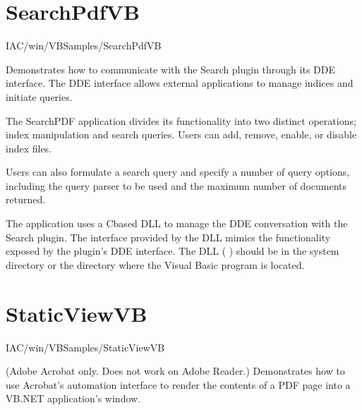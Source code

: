\documentclass[letterpaper,12pt,english,openany,oneside]{sphinxmanual}
\begin{document}
\section{SearchPdfVB}
\label{\detokenize{Samples_WindowsIAC:searchpdfvb}}\label{\detokenize{Samples_WindowsIAC:location-21}}

IAC/win/VBSamples/SearchPdfVB

\label{\detokenize{Samples_WindowsIAC:description-21}}

Demonstrates how to communicate with the Search plugin through its DDE interface. The DDE interface allows external applications to manage indices and initiate queries.

\label{\detokenize{Samples_WindowsIAC:usage-13}}

The SearchPDF application divides its functionality into two distinct operations; index manipulation and search queries. Users can add, remove, enable, or disable index files.

Users can also formulate a search query and specify a number of query options, including the query parser to be used and the maximum number of documents returned.

\label{\detokenize{Samples_WindowsIAC:implementation-details-5}}

The application uses a C\sphinxhyphen{}based DLL to manage the DDE conversation with the Search plugin. The interface provided by the DLL mimics the functionality exposed by the plugin’s DDE interface. The DLL ( ) should be in the system directory or the directory where the Visual Basic program is located.


\section{StaticViewVB}
\label{\detokenize{Samples_WindowsIAC:staticviewvb}}\label{\detokenize{Samples_WindowsIAC:location-22}}

IAC/win/VBSamples/StaticViewVB

\label{\detokenize{Samples_WindowsIAC:description-22}}

(Adobe Acrobat only. Does not work on Adobe Reader.) Demonstrates how to use Acrobat’s automation interface to render the contents of a PDF page into a VB.NET application’s window.
\end{document}

